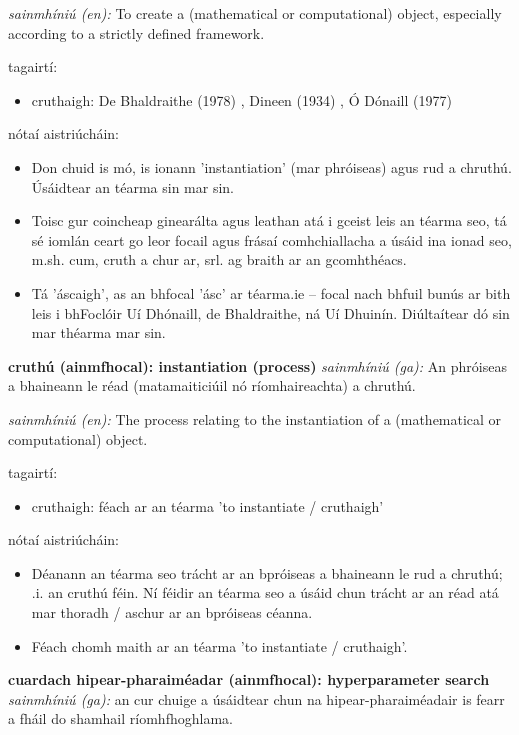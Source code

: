 \documentclass{article}
\begin{document}
\textit{sainmhíniú (en):} To create a (mathematical or computational) object, especially according to a strictly defined framework.

tagairtí:
\begin{itemize}
	\item cruthaigh: De Bhaldraithe (1978) \cite{de-bhaldraithe}, Dineen (1934) \cite{dineen}, Ó Dónaill (1977) \cite{odonaill}
\end{itemize}

nótaí aistriúcháin:
\begin{itemize}
	\item Don chuid is mó, is ionann 'instantiation' (mar phróiseas) agus rud a chruthú. Úsáidtear an téarma sin mar sin.
	\item Toisc gur coincheap ginearálta agus leathan atá i gceist leis an téarma seo, tá sé iomlán ceart go leor focail agus frásaí comhchiallacha a úsáid ina ionad seo, m.sh. cum, cruth a chur ar, srl. ag braith ar an gcomhthéacs.
	\item Tá 'áscaigh', as an  bhfocal 'ásc' ar téarma.ie -- focal nach bhfuil bunús ar bith leis i bhFoclóir Uí Dhónaill, de Bhaldraithe, ná Uí Dhuinín. Diúltaítear dó sin mar théarma mar sin.
\end{itemize}


\textbf{cruthú (ainmfhocal): instantiation (process)}
\textit{sainmhíniú (ga):} An phróiseas a bhaineann le réad (matamaiticiúil nó ríomhaireachta) a chruthú.

\textit{sainmhíniú (en):} The process relating to the instantiation of a (mathematical or computational) object.

tagairtí:
\begin{itemize}
	\item cruthaigh: féach ar an téarma 'to instantiate / cruthaigh'
\end{itemize}

nótaí aistriúcháin:
\begin{itemize}
	\item Déanann an téarma seo trácht ar an bpróiseas a bhaineann le rud a chruthú; .i. an cruthú féin. Ní féidir an téarma seo a úsáid chun trácht ar an réad atá mar thoradh / aschur ar an bpróiseas céanna.
	\item Féach chomh maith ar an téarma 'to instantiate / cruthaigh'.
\end{itemize}


\textbf{cuardach hipear-pharaiméadar (ainmfhocal): hyperparameter search}
\textit{sainmhíniú (ga):} an cur chuige a úsáidtear chun na hipear-pharaiméadair is fearr a fháil do shamhail ríomhfhoghlama.
\end{document}
